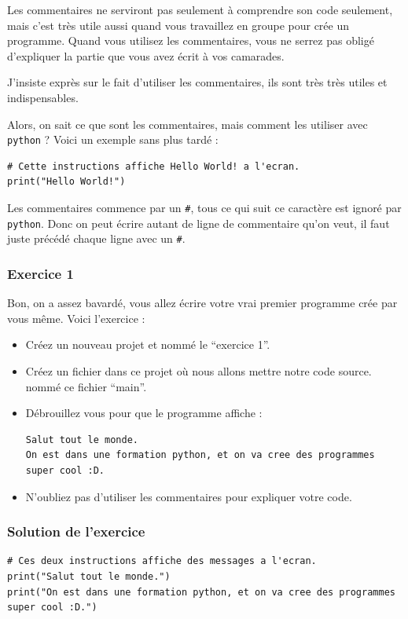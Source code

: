 \documentclass[12pt]{article}
\newcommand{\code}[1]{\colorbox{light-gray}{\texttt{#1}}}
\begin{document}
            Les commentaires ne serviront pas seulement à comprendre son code seulement, mais c'est très utile aussi
            quand vous travaillez en groupe pour crée un programme. Quand vous utilisez les commentaires, vous ne serrez
            pas obligé d'expliquer la partie que vous avez écrit à vos camarades.
            
            J'insiste exprès sur le fait d'utiliser les commentaires, ils sont très très utiles et indispensables.

            Alors, on sait ce que sont les commentaires, mais comment les utiliser avec \code{python} ? Voici 
            un exemple sans plus tardé :
            \begin{lstlisting}[style=code]
# Cette instructions affiche Hello World! a l'ecran.
print("Hello World!") 
            \end{lstlisting}

            Les commentaires commence par un \code{\#}, tous ce qui suit ce caractère est ignoré par \code{python}.
            Donc on peut écrire autant de ligne de commentaire qu'on veut, il faut juste précédé chaque ligne avec un
            \code{\#}.

        \subsubsection{Exercice 1}
            Bon, on a assez bavardé, vous allez écrire votre vrai premier programme crée par vous même.
            Voici l'exercice :
            \begin{itemize}
                \item Créez un nouveau projet et nommé le ``exercice 1''.
                \item Créez un fichier dans ce projet où nous allons mettre notre code source. nommé ce fichier
                    ``main''.
                \item Débrouillez vous pour que le programme affiche :
                    \begin{lstlisting}[style=exec_result, breaklines=false]
Salut tout le monde.
On est dans une formation python, et on va cree des programmes super cool :D.
                    \end{lstlisting}
                \item N'oubliez pas d'utiliser les commentaires pour expliquer votre code.
            \end{itemize}

        \subsubsection{Solution de l'exercice}
            \begin{lstlisting}[style=code, breaklines=false]
# Ces deux instructions affiche des messages a l'ecran.
print("Salut tout le monde.")
print("On est dans une formation python, et on va cree des programmes super cool :D.")
            \end{lstlisting}
\end{document}
